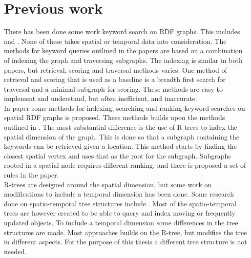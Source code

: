 \section{Previous work}
There has been done some work keyword search on RDF graphs. This includes \cite{4812421} and \cite{Elbassuoni:2011:KSO:2063576.2063615}. None of these takes spatial or temporal data into consideration. The methods for keyword queries outlined in the papers are based on a combination of indexing the graph and traversing subgraphs. The indexing is similar in both papers, but retrieval, scoring and traversal methods varies. One method of retrieval and scoring that is used as a baseline is a breadth first search for traversal and a minimal subgraph for scoring. These methods are easy to implement and understand, but often inefficient, and inaccurate.\\
In paper \cite{Shi:2016:TRS:2882903.2882941} some methods for indexing, searching and ranking keyword searches on spatial RDF graphs is proposed. These methods builds upon the methods outlined in \cite{4812421, Elbassuoni:2011:KSO:2063576.2063615}. The most substantial difference is the use of R-trees to index the spatial dimension of the graph. This is done so that a subgraph containing the keywords can be retrieved given a location. This method starts by finding the closest spatial vertex and uses that as the root for the subgraph. Subgraphs rooted in a spatial node requires different ranking, and there is proposed a set of rules in the paper.\\
R-trees are designed around the spatial dimension, but some work on modifications to include a temporal dimension has been done. Some research done on spatio-temporal tree structures include \cite{Tao:2003:TOS:1315451.1315519, r-tree-spatio-temporal}. Most of the spatio-temporal trees are however created to be able to query and index moving or frequently updated objects. To include a temporal dimension some differences in the tree structures are made. Most approaches builds on the R-tree, but modifies the tree in different aspects. For the purpose of this thesis a different tree structure is not needed.\\ %


\clearpage